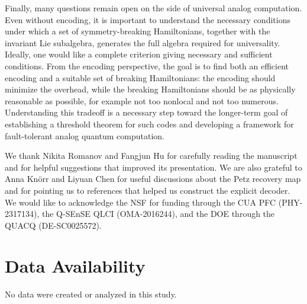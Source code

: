 \documentclass[10pt,twocolumn,superscriptaddress,aps,amsmath,amssymb,citeautoscript,floatfix,prx]{revtex4-2}
\newcounter{alg}
\theoremstyle{plain}
\theoremstyle{plain}
\theoremstyle{plain}
\theoremstyle{plain}
\theoremstyle{plain}
\theoremstyle{plain}
\theoremstyle{plain}
\theoremstyle{definition}
\theoremstyle{plain}
\begin{document}
Finally, many questions remain open on the side of universal analog computation. Even without encoding, it is important to understand the necessary conditions under which a set of 
symmetry-breaking Hamiltonians, together with the invariant Lie subalgebra, generates the full algebra required for universality. 
Ideally, one would like a complete criterion giving necessary and sufficient conditions. From the encoding perspective, the goal is to find both an efficient encoding 
and a suitable set of breaking Hamiltonians: the encoding should minimize the overhead, while the breaking Hamiltonians should be as physically reasonable as possible, 
for example not too nonlocal and not too numerous. Understanding this tradeoff is a necessary step toward the longer-term goal of establishing a threshold theorem for such codes 
and developing a framework for fault-tolerant analog quantum computation.
 
\begin{acknowledgments}
We thank Nikita Romanov and Fangjun Hu for carefully reading the manuscript and for helpful suggestions that improved its presentation. We are also grateful to Anna Knörr and Liyuan Chen for useful discussions about the Petz recovery map and for pointing us to references that helped us construct the explicit decoder. We would like to acknowledge the NSF for funding through the CUA PFC (PHY-2317134), the Q-SEnSE QLCI (OMA-2016244), and the DOE through the QUACQ (DE-SC0025572).
\end{acknowledgments}
 
\section*{Data Availability}
No data were created or analyzed in this study.
 

\let\addcontentsline\oldaddcontentsline
\end{document}
